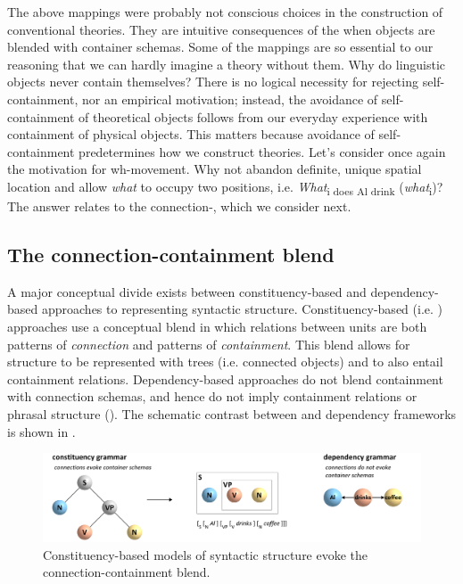   The above mappings were probably not conscious choices in the construction of conventional theories. They are intuitive consequences of the  when objects are blended with container schemas. Some of the mappings are so essential to our reasoning that we can hardly imagine a theory without them. Why do linguistic objects never contain themselves? There is no logical necessity for rejecting self-containment, nor an empirical motivation; instead, the avoidance of self-containment of theoretical objects follows from our everyday experience with containment of physical objects. This matters because avoidance of self-containment predetermines how we construct theories. Let's consider once again the motivation for wh-movement. Why not abandon definite, unique spatial location and allow \textit{what} to occupy two positions, i.e. \textit{What}\textsubscript{i does Al drink} (\textit{what}\textsubscript{i})? The answer relates to the connection-, which we consider next.

\subsection{The connection-containment blend}

A major conceptual divide exists between constituency-based and dependency-based approaches to representing syntactic structure. Constituency-based (i.e. ) approaches use a conceptual blend in which relations between units are both patterns of \textit{connection} and patterns of \textit{containment}. This blend allows for structure to be represented with trees (i.e. connected objects) and to also entail containment relations. Dependency-based approaches do not blend containment with connection schemas, and hence do not imply containment relations or phrasal structure (\citealt{Hays1964,Melʹčuk1988,Osborne2006,OsborneEtAl2011,Percival1990,Tesnière2018}). The schematic contrast between  and dependency frameworks is shown in {}. 

  
\begin{figure}
\includegraphics[width=\textwidth]{figures/Tilsen-img34.png}
\caption{Constituency-based models of syntactic structure evoke the connection-containment blend.}
\label{fig:3:6}
\end{figure}
 

